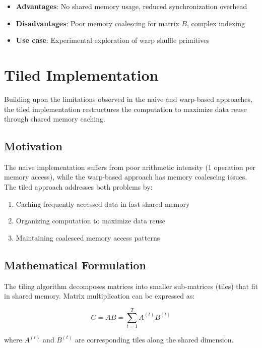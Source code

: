 \documentclass{amsbook}
\theoremstyle{definition}
\begin{document}
\begin{itemize}
\item \textbf{Advantages}: No shared memory usage, reduced synchronization overhead
\item \textbf{Disadvantages}: Poor memory coalescing for matrix $B$, complex indexing
\item \textbf{Use case}: Experimental exploration of warp shuffle primitives
\end{itemize}

\section{Tiled Implementation}

Building upon the limitations observed in the naive and warp-based approaches, the tiled implementation restructures the computation to maximize data reuse through shared memory caching.

\subsection{Motivation}

The naive implementation suffers from poor arithmetic intensity (1 operation per memory access), while the warp-based approach has memory coalescing issues. The tiled approach addresses both problems by:

\begin{enumerate}
\item Caching frequently accessed data in fast shared memory
\item Organizing computation to maximize data reuse
\item Maintaining coalesced memory access patterns
\end{enumerate}

\subsection{Mathematical Formulation}

The tiling algorithm decomposes matrices into smaller sub-matrices (tiles) that fit in shared memory. Matrix multiplication can be expressed as:

\begin{equation}
C = AB = \sum_{t=1}^{T} A^{(t)} B^{(t)}
\end{equation}

where $A^{(t)}$ and $B^{(t)}$ are corresponding tiles along the shared dimension.
\end{document}
